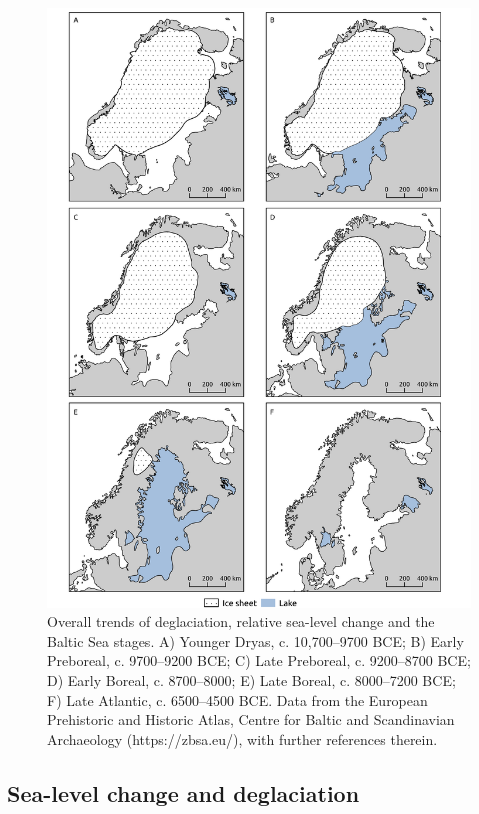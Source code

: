 \documentclass[
  12pt,
  a4paper,
  oneside]{book}
\begin{document}
\begin{figure}

{\centering \includegraphics[width=1.05\linewidth,height=1.05\textheight]{figures/palaeo-maps} 

}

\caption{Overall trends of deglaciation, relative sea-level change and the Baltic Sea stages. A) Younger Dryas, c. 10,700--9700 BCE; B) Early Preboreal, c. 9700--9200 BCE; C) Late Preboreal, c. 9200--8700 BCE; D) Early Boreal, c. 8700--8000; E) Late Boreal, c. 8000--7200 BCE; F) Late Atlantic, c. 6500--4500 BCE. Data from the European Prehistoric and Historic Atlas, Centre for Baltic and Scandinavian Archaeology (https://zbsa.eu/), with further references therein.}\label{fig:palaeo-maps}
\end{figure}

\hypertarget{sea-level-change-and-deglaciation}{%
\subsection{Sea-level change and deglaciation}\label{sea-level-change-and-deglaciation}}
\end{document}
